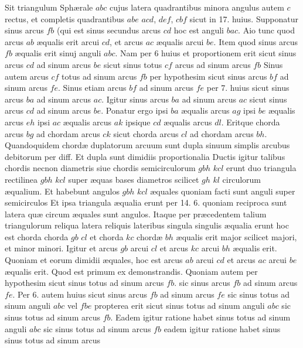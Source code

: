 \documentclass[11pt,a4paper]{article}
\begin{document}

Sit triangulum Sphærale $abc$ cujus latera quadrantibus minora angulus autem $c$ rectus, et completis quadrantibus $abe$ $acd$, $def$, $cbf$ sicut in 17. huius. Supponatur sinus arcus $fb$ (qui est sinus secundus arcus $cd$ hoc est anguli $bac$. Aio tunc quod arcus $ab$ æqualis erit arcui $cd$, et arcus $ac$ æqualis arcui $be$. Item quod sinus arcus $fb$ æqualis erit  sinuj anguli $abc$. Nam per 6 huius et  proportionem erit sicut sinus arcus $cd$ ad sinum arcus $be$ sicut sinus totus $cf$ arcus ad sinum arcus $fb$ Sinus autem arcus $cf$ totus ad sinum arcus $fb$ per hypothesim sicut sinus arcus $bf$  ad sinum arcus $fe$. Sinus etiam arcus $bf$ ad sinum arcus $fe$ per 7. huius sicut sinus arcus $ba$ ad sinum arcus $ac$. Igitur sinus arcus $ba$ ad sinum arcus $ac$ sicut sinus arcus $cd$ ad sinum arcus $be$. Ponatur ergo ipsi $ba$ æqualis arcus $ag$ ipsi $be$ æqualis arcus $eh$ ipsi $ac$ æqualis arcus $ak$ ipsique $cd$ æqualis arcus $dl$. Eritque chorda arcus $bg$ ad chordam arcus $ck$ sicut chorda arcus $cl$ ad chordam arcus $bh$. Quandoquidem chordæ duplatorum arcuum sunt dupla sinuum simplis arcubus debitorum per diff. Et dupla sunt dimidiis proportionalia Ductis igitur talibus chordis necnon diametris siue chordis semicirculorum $gbh$ $kcl$ erunt duo triangula rectilinea $gbh$ $kcl$ super æquas bases diametros scilicet $gh$ $kl$ circulorum æqualium. Et habebunt angulos $gbh$ $kcl$ æquales quoniam facti sunt anguli super semicirculos Et ipsa triangula æqualia erunt per 14. 6. quoniam reciproca sunt latera quæ circum æquales sunt angulos. Itaque per præcedentem talium triangulorum reliqua latera reliquis lateribus singula singulis æqualia erunt hoc est chorda chorda $gb$  $cl$ et chorda $kc$ chordæ $bh$ æqualis erit major scilicet majori, et minor minori. Igitur et arcus $gb$ arcui $cl$ et arcus $kc$ arcui $bh$ æqualis erit. Quoniam et eorum dimidii æquales, hoc est arcus $ab$ arcui $cd$ et arcus $ac$ arcui $be$ æqualis erit. Quod est primum ex demonstrandis. Quoniam autem per hypothesim sicut sinus totus ad sinum arcus $fb$. sic sinus arcus $fb$ ad sinum arcus $fe$. Per 6. autem huius sicut sinus arcus $fb$  ad sinum arcus $fe$ sic sinus totus ad sinum anguli $abc$ vel $fbe$  propterea erit sicut sinus totus ad sinum anguli $abc$ sic sinus totus ad sinum arcus $fb$. Eadem igitur ratione habet sinus totus ad sinum  anguli $abc$ sic sinus totus ad sinum arcus $fb$ eadem igitur ratione habet sinus sinus totus ad sinum arcus
\end{document}
